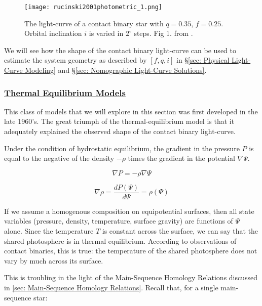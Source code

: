 \documentclass[12pt]{article} %
\numberwithin{equation}{section} %
\begin{document}
\begin{figure}[H]
\centering
\texttt{[image: rucinski2001photometric\_1.png]}
\caption{The light-curve of a contact binary star with $q = 0.35$, $f = 0.25$. Orbital inclination $i$ is varied in $2^{\circ}$ steps. Fig 1. from \citet{rucinski2001photometric}.}
\label{fig: rucinski2001photometric_1}
\end{figure}

We will see how the shape of the contact binary light-curve can be used to estimate the system geometry as described by $[f,q,i]$ in \S\ref{sec: Physical Light-Curve Modeling} and \S\ref{sec: Nomographic Light-Curve Solutions}.

\subsubsection[Thermal Equilibrium Models]{\hyperlink{toc}{Thermal Equilibrium Models}} \label{sec: Thermal Equilibrium Models}

This class of models that we will explore in this section was first developed in the late 1960's. The great triumph of the thermal-equilibrium model is that it adequately explained the observed shape of the contact binary light-curve. 

Under the condition of hydrostatic equilibrium, the gradient in the pressure $P$ is equal to the negative of the density $- \rho$ times the gradient in the potential $\nabla \Psi$. 

\begin{equation} \label{eqn: equilibrium1}
\nabla P = - \rho \nabla \Psi
\end{equation}

\begin{equation} \label{eqn: equilibrium2}
\nabla \rho = \frac{dP(\Psi)}{d\Psi} = \rho(\Psi)
\end{equation}

If we assume a homogenous composition on equipotential surfaces, then all state variables (pressure, density, temperature, surface gravity) are functions of $\Psi$ alone. Since the temperature $T$ is constant across the surface, we can say that the shared photosphere is in thermal equilibrium. According to observations of contact binaries, this is true: the temperature of the shared photosphere does not vary by much across its surface. 

This is troubling in the light of the Main-Sequence Homology Relations discussed in \ref{sec: Main-Sequence Homology Relations}. Recall that, for a single main-sequence star:
\end{document}
